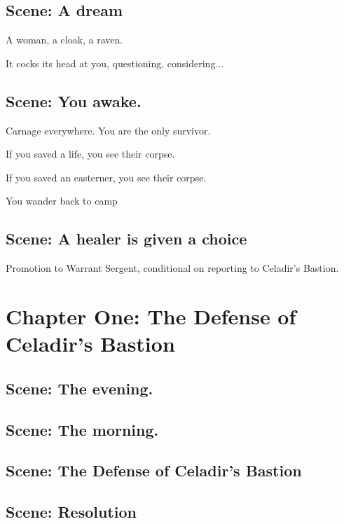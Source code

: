 \documentclass{report}
\begin{document}
  \subsection{Scene: A dream}

  A woman, a cloak, a raven.

  It cocks its head at you, questioning, considering...

  \subsection{Scene: You awake.}

  Carnage everywhere.
  You are the only survivor.

  If you saved a life, you see their corpse.

  If you saved an easterner, you see their corpse.

  You wander back to camp

  \subsection{Scene: A healer is given a choice}

  Promotion to Warrant Sergent, conditional on reporting to Celadir's Bastion.





  \section{Chapter One: The Defense of Celadir's Bastion}\label{sec:chapterOne:TheDefenseOfCeladir'sBastion}
  \subsection{Scene: The evening.}\label{subsec:scene:TheEvening.}
  \subsection{Scene: The morning.}\label{subsec:scene:TheMorning.}
  \subsection{Scene: The Defense of Celadir's Bastion}\label{subsec:scene:TheDefenseOfCeladir'sBastion}
  \subsection{Scene: Resolution}\label{subsec:scene:Resolution}
\end{document}
